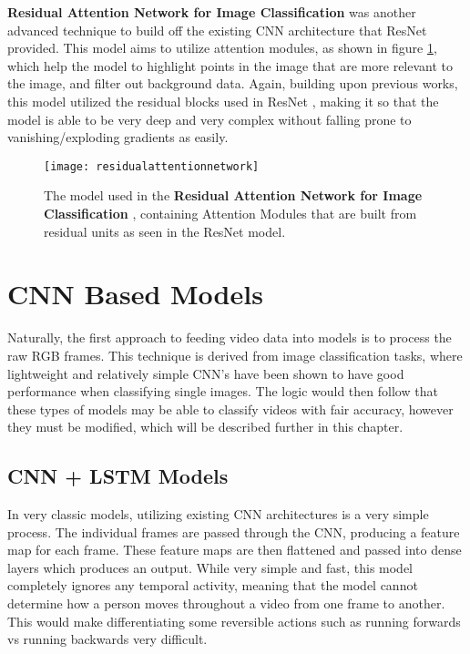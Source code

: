 \textbf{Residual Attention Network for Image Classification} \cite{residualattentionnetwork} was another advanced technique to build off the existing CNN architecture that ResNet provided. This model aims to utilize attention modules, as shown in figure \ref{fig:residualattentionnetwork}, which help the model to highlight points in the image that are more relevant to the image, and filter out background data. Again, building upon previous works, this model utilized the residual blocks used in ResNet \cite{resnet}, making it so that the model is able to be very deep and very complex without falling prone to vanishing/exploding gradients as easily.

\begin{figure}[ht]
	\texttt{[image: residualattentionnetwork]}
	\centering
	\caption{The model used in the \textbf{Residual Attention Network for Image Classification} \cite{residualattentionnetwork}, containing Attention Modules that are built from residual units as seen in the ResNet \cite{resnet} model.}
	\label{fig:residualattentionnetwork}
\end{figure}

\section{CNN Based Models}

Naturally, the first approach to feeding video data into models is to process the raw RGB frames. This technique is derived from image classification tasks, where lightweight and relatively simple CNN's have been shown to have good performance when classifying single images. The logic would then follow that these types of models may be able to classify videos with fair accuracy, however they must be modified, which will be described further in this chapter.

\subsection{CNN + LSTM Models}

In very classic models, utilizing existing CNN architectures is a very simple process. The individual frames are passed through the CNN, producing a feature map for each frame. These feature maps are then flattened and passed into dense layers which produces an output. While very simple and fast, this model completely ignores any temporal activity, meaning that the model cannot determine how a person moves throughout a video from one frame to another. This would make differentiating some reversible actions such as running forwards vs running backwards very difficult.

